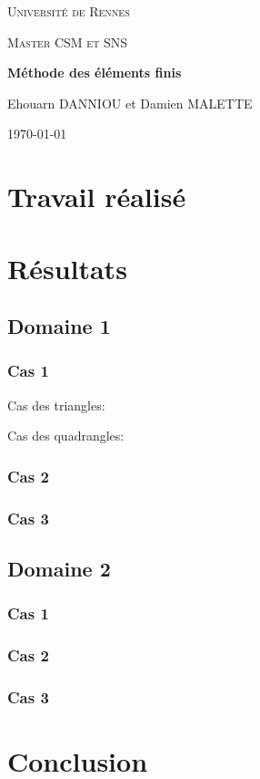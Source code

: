 \documentclass{article}
\numberwithin{equation}{section}
\begin{document}
\begin{titlepage}
    \centering
    
    {\scshape\LARGE Université de Rennes \par}
    \vspace{1cm}
    
    {\scshape\Large Master CSM et SNS \par}
    \vspace{1.5cm}
    
    {\huge\bfseries Méthode des éléments finis	\par}
    \vspace{2cm}
    
    {\Large Ehouarn DANNIOU et Damien MALETTE\par}
    \vspace{0.5cm}
    \vfill
    
    {\large \today\par}
    
\end{titlepage}
\tableofcontents
\newpage
\section{Travail réalisé}
\section{Résultats}
\subsection{Domaine 1}
\subsubsection{Cas 1}
Cas des triangles:


Cas des quadrangles:
\subsubsection{Cas 2}
\subsubsection{Cas 3}
\subsection{Domaine 2}
\subsubsection{Cas 1}
\subsubsection{Cas 2}
\subsubsection{Cas 3}
\section{Conclusion}
\end{document}
